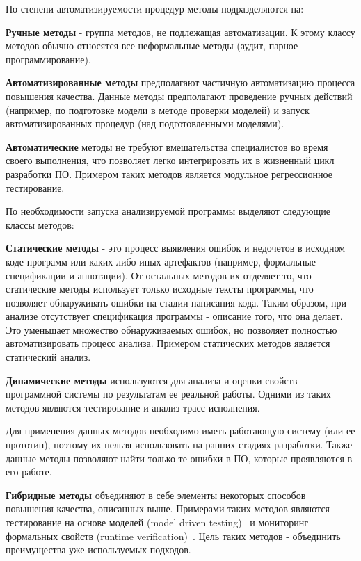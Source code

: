 По степени автоматизируемости процедур методы подразделяются на:

\textbf{Ручные методы} - группа методов, не подлежащая автоматизации. К этому
классу методов обычно относятся все неформальные методы (аудит, парное
программирование).

\textbf{Автоматизированные методы} предполагают частичную автоматизацию процесса
повышения качества. Данные методы предполагают проведение ручных действий
(например, по подготовке модели в методе проверки моделей) и запуск
автоматизированных процедур (над подготовленными моделями).

\textbf{Автоматические} методы не требуют вмешательства специалистов во время
своего выполнения, что позволяет легко интегрировать их в жизненный цикл
разработки ПО. Примером таких методов является модульное регрессионное
тестирование.

По необходимости запуска анализируемой программы выделяют следующие классы
методов:

\textbf{Статические методы} - это процесс выявления ошибок и недочетов в
исходном коде программ или каких-либо иных артефактов (например, формальные
спецификации и аннотации). От остальных методов их отделяет то, что статические
методы использует только исходные тексты программы, что позволяет обнаруживать
ошибки на стадии написания кода. Таким образом, при анализе отсутствует
спецификация программы - описание того, что она делает. Это уменьшает множество
обнаруживаемых ошибок, но позволяет полностью автоматизировать процесс анализа.
Примером статических методов является статический анализ.

\textbf{Динамические методы} используются для анализа и оценки свойств
программной системы по результатам ее реальной работы. Одними из таких методов
являются тестирование и анализ трасс исполнения.

Для применения данных методов необходимо иметь работающую систему (или ее
прототип), поэтому их нельзя использовать на ранних стадиях разработки. Также
данные методы позволяют найти только те ошибки в ПО, которые проявляются в его
работе.

\textbf{Гибридные методы} объединяют в себе элементы некоторых способов
повышения качества, описанных выше. Примерами таких методов являются
тестирование на основе моделей (model driven testing)~\cite{Vieira2006} и
мониторинг формальных свойств (runtime
verification)~\cite{runtime_verification}. Цель таких методов - объединить
преимущества уже используемых подходов.

